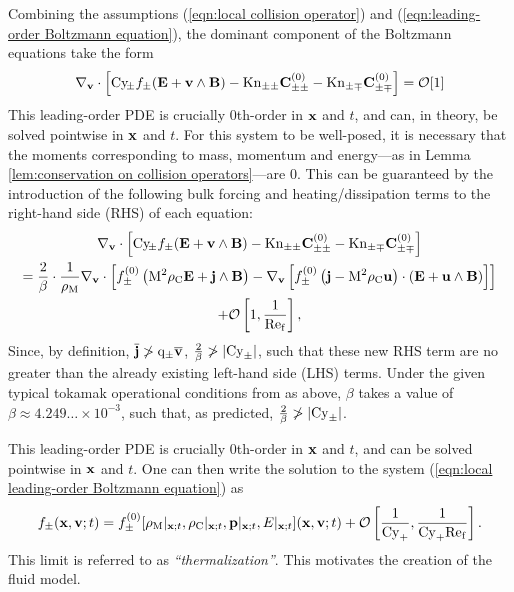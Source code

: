     Combining the assumptions (\ref{eqn:local collision operator}) and (\ref{eqn:leading-order Boltzmann equation}), the dominant component of the Boltzmann equations take the form
    \begin{equation}
        \nabla_{\mathbf{v}}\cdot\left[\mathrm{Cy}\!_{\pm}f_{\pm}(\mathbf{E} + \mathbf{v}\wedge\mathbf{B}) - \mathrm{Kn}_{\pm\pm}\mathbf{C}_{\pm\pm}^{(0)} - \mathrm{Kn}_{\pm\mp}\mathbf{C}_{\pm\mp}^{(0)}\right]  =  \mathcal{O}[1]
    \end{equation}
    This leading-order PDE is crucially 0th-order in $\mathbf{x}$ and $t$, and can, in theory, be solved pointwise in $\mathbf{x}$ and $t$. For this system to be well-posed, it is necessary that the moments corresponding to mass, momentum and energy---as in Lemma \ref{lem:conservation on collision operators}---are 0. This can be guaranteed by the introduction of the following bulk forcing and heating/dissipation terms to the right-hand side (RHS) of each equation:
    \begin{multline}\label{eqn:local leading-order Boltzmann equation}
        \nabla_{\mathbf{v}}\cdot\left[\mathrm{Cy}\!_{\pm}f_{\pm}(\mathbf{E} + \mathbf{v}\wedge\mathbf{B}) - \mathrm{Kn}_{\pm\pm}\mathbf{C}_{\pm\pm}^{(0)} - \mathrm{Kn}_{\pm\mp}\mathbf{C}_{\pm\mp}^{(0)}\right]  \\
        =  \frac{2}{\beta}\cdot\frac{1}{\rho_{\mathrm{M}}}\nabla_{\mathbf{v}}\cdot\left[f_{\pm}^{(0)}\left(\mathrm{M}^{2}\rho_{\mathrm{C}}\mathbf{E} + \mathbf{j}\wedge\mathbf{B}\right) - \nabla_{\mathbf{v}}\left[f_{\pm}^{(0)}\left(\mathbf{j} - \mathrm{M}^{2}\rho_{\mathrm{C}}\mathbf{u}\right)\cdot\left(\mathbf{E} + \mathbf{u}\wedge\mathbf{B}\right)\right]\right]  \\
        + \mathcal{O}\left[1, \frac{1}{\mathrm{Re}_{\mathrm{f}}}\right],
    \end{multline}
    Since, by definition, $\overline{\mathbf{j}}  \ngtr  \mathrm{q}_{\pm}\overline{\mathbf{v}}$, $\frac{2}{\beta}  \ngtr  |\mathrm{Cy}_{\pm}|$, such that these new RHS term are no greater than the already existing left-hand side (LHS) terms.  Under the given typical tokamak operational conditions from \cite{Wes00} as above, $\beta$ takes a value of $\beta  \approx 4.249\ldots\times 10^{- 3}$, such that, as predicted, $\frac{2}{\beta}  \ngtr  |\mathrm{Cy}_{\pm}|$.
    
    This leading-order PDE is crucially 0th-order in $\mathbf{x}$ and $t$, and can be solved pointwise in $\mathbf{x}$ and $t$. One can then write the solution to the system (\ref{eqn:local leading-order Boltzmann equation}) as
    \begin{equation}\label{eqn:thermalization}
        f_{\pm}(\mathbf{x}, \mathbf{v}; t)  =  f_{\pm}^{(0)}[\rho_{\mathrm{M}}|_{\mathbf{x}; t}, \rho_{\mathrm{C}}|_{\mathbf{x}; t}, \mathbf{p}|_{\mathbf{x}; t}, E|_{\mathbf{x}; t}](\mathbf{x}, \mathbf{v}; t) + \mathcal{O}\left[\frac{1}{\mathrm{Cy}_{+}}, \frac{1}{\mathrm{Cy}_{+}\mathrm{Re}_{\mathrm{f}}}\right].
    \end{equation}
    This limit is referred to as \emph{``thermalization''}. This motivates the creation of the fluid model.

    
